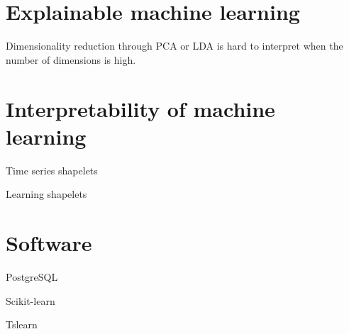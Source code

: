 \section{Explainable machine learning}

Dimensionality reduction through PCA or LDA is hard to interpret when the number of dimensions is high.

\section{Interpretability of machine learning}

Time series shapelets  \citep{DBLP:conf/kdd/YeK09}

Learning shapelets \citep{DBLP:conf/kdd/GrabockaSWS14}

\section{Software}

PostgreSQL \citep{postgresql}

Scikit-learn \citep{DBLP:journals/jmlr/PedregosaVGMTGBPWDVPCBPD11}

Tslearn \citep{DBLP:journals/jmlr/TavenardFVDAHPY20}
